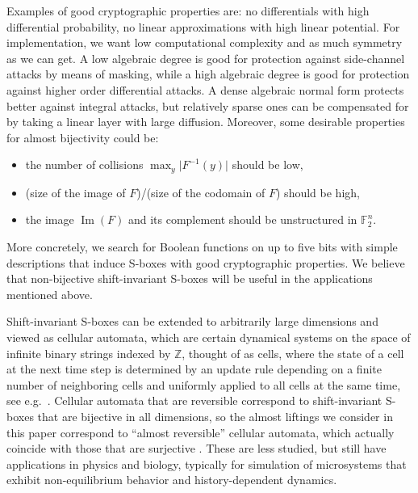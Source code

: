 \documentclass[11pt,english,a4paper]{amsart}
\theoremstyle{plain}
\theoremstyle{definition}
\theoremstyle{remark}
\newcommand{\Z}{\mathbb{Z}}
\newcommand{\F}{\mathbb{F}}
\begin{document}
	Examples of good cryptographic properties are: no differentials with high differential probability, no linear approximations with high linear potential. For implementation, we want low computational complexity and as much symmetry as we can get.
	A low algebraic degree is good for protection against side-channel attacks by means of masking, while a high algebraic degree is good for protection against higher order differential attacks. A dense algebraic normal form protects better against integral attacks, but relatively sparse ones can be compensated for by taking a linear layer with large diffusion. Moreover, some desirable properties for almost bijectivity could be:
 	\begin{itemize}
	\item[(P1)] the number of collisions $\max_y \lvert F^{-1}(y)\rvert$ should be low,
	\item[(P2)] (size of the image of $F$)/(size of the codomain of $F$) should be high,
	\item[(P3)] the image $\operatorname{Im}(F)$ and its complement should be unstructured in $\F_2^n$.
	\end{itemize}

	More concretely, we search for Boolean functions on up to five bits with simple descriptions that induce S-boxes with good cryptographic properties. We believe that non-bijective shift-invariant S-boxes will be useful in the applications mentioned above. %
	
	Shift-invariant S-boxes can be extended to arbitrarily large dimensions and viewed as cellular automata, which are certain dynamical systems on the space of infinite binary strings indexed by $\Z$, thought of as cells, where the state of a cell at the next time step is determined by an update rule depending on a finite number of neighboring cells and uniformly applied to all cells at the same time, see e.g.~\cite{Mariot-24,mariot2021evolutionary, mariot2019cellular}.
	Cellular automata that are reversible correspond to shift-invariant S-boxes that are bijective in all dimensions, so the almost liftings we consider in this paper correspond to ``almost reversible'' cellular automata, which actually coincide with those that are surjective \cite{hedlund}. These are less studied, but still have applications in physics and biology, typically for simulation of microsystems that exhibit non-equilibrium behavior and history-dependent dynamics.
	
\end{document}
